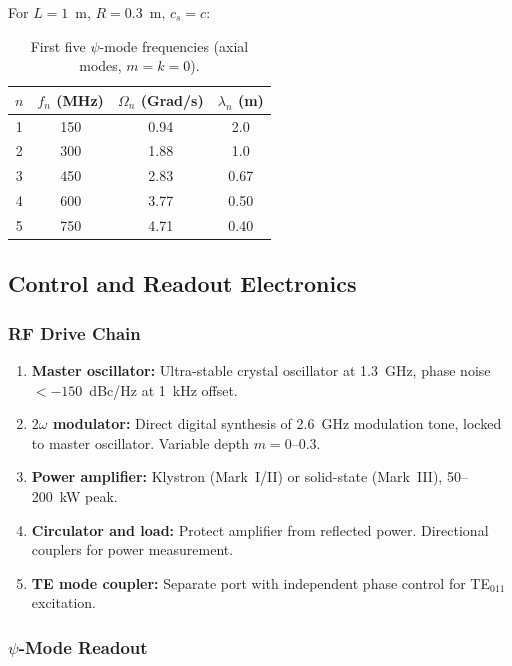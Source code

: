 \documentclass[11pt,a4paper]{article}
\begin{document}
For $L = 1$~m, $R = 0.3$~m, $c_s = c$:

\begin{table}[h]
\centering
\caption{First five $\psi$-mode frequencies (axial modes, $m=k=0$).}
\label{tab:psi-modes}
\begin{tabular}{@{}cccc@{}}
\toprule
$n$ & $f_n$ (MHz) & $\Omega_n$ (Grad/s) & $\lambda_n$ (m) \\
\midrule
1 & 150 & 0.94 & 2.0 \\
2 & 300 & 1.88 & 1.0 \\
3 & 450 & 2.83 & 0.67 \\
4 & 600 & 3.77 & 0.50 \\
5 & 750 & 4.71 & 0.40 \\
\bottomrule
\end{tabular}
\end{table}

\subsection{Control and Readout Electronics}

\subsubsection{RF Drive Chain}

\begin{enumerate}
\item \textbf{Master oscillator:} Ultra-stable crystal oscillator at
1.3~GHz, phase noise $< -150$~dBc/Hz at 1~kHz offset.

\item \textbf{$2\omega$ modulator:} Direct digital synthesis of 2.6~GHz
modulation tone, locked to master oscillator.  Variable depth $m = 0$--$0.3$.

\item \textbf{Power amplifier:} Klystron (Mark~I/II) or solid-state
(Mark~III), 50--200~kW peak.

\item \textbf{Circulator and load:} Protect amplifier from reflected
power.  Directional couplers for power measurement.

\item \textbf{TE mode coupler:} Separate port with independent phase
control for TE$_{011}$ excitation.
\end{enumerate}

\subsubsection{$\psi$-Mode Readout}
\end{document}
